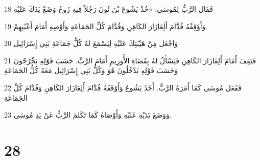 \par 18 فَقَال الرَّبُّ لِمُوسَى: «خُذْ يَشُوعَ بْنَ نُونَ رَجُلاً فِيهِ رُوحٌ وَضَعْ يَدَكَ عَليْهِ
\par 19 وَأَوْقِفْهُ قُدَّامَ أَلِعَازَارَ الكَاهِنِ وَقُدَّامَ كُلِّ الجَمَاعَةِ وَأَوْصِهِ أَمَامَ أَعْيُنِهِمْ.
\par 20 وَاجْعَل مِنْ هَيْبَتِكَ عَليْهِ لِيَسْمَعَ لهُ كُلُّ جَمَاعَةِ بَنِي إِسْرَائِيل
\par 21 فَيَقِفَ أَمَامَ أَلِعَازَارَ الكَاهِنِ فَيَسْأَلُ لهُ بِقَضَاءِ الأُورِيمِ أَمَامَ الرَّبِّ. حَسَبَ قَوْلِهِ يَخْرُجُونَ وَحَسَبَ قَوْلِهِ يَدْخُلُونَ هُوَ وَكُلُّ بَنِي إِسْرَائِيل مَعَهُ كُلُّ الجَمَاعَةِ
\par 22 فَفَعَل مُوسَى كَمَا أَمَرَهُ الرَّبُّ. أَخَذَ يَشُوعَ وَأَوْقَفَهُ قُدَّامَ أَلِعَازَارَ الكَاهِنِ وَقُدَّامَ كُلِّ الجَمَاعَةِ
\par 23 وَوَضَعَ يَدَيْهِ عَليْهِ وَأَوْصَاهُ كَمَا تَكَلمَ الرَّبُّ عَنْ يَدِ مُوسَى.

\chapter{28}

